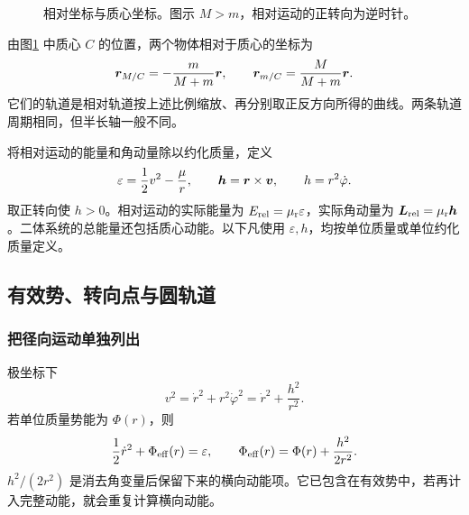 \begin{figure}[H]\centering
{}
\caption{相对坐标与质心坐标。图示 $M>m$，相对运动的正转向为逆时针。}\label{sup8:fig:d8-two-body}
\end{figure}

由图\ref{sup8:fig:d8-two-body} 中质心 $C$ 的位置，两个物体相对于质心的坐标为
\[
 \bm{r}_{M/C}=-\frac{m}{M+m}\bm{r},\qquad
 \bm{r}_{m/C}=\frac{M}{M+m}\bm{r}.
\]
它们的轨道是相对轨道按上述比例缩放、再分别取正反方向所得的曲线。两条轨道周期相同，但半长轴一般不同。

将相对运动的能量和角动量除以约化质量，定义
\begin{equation}\label{sup8:eq:d8-invariants}
 \varepsilon=\frac12v^2-\frac{\mu}{r},\qquad
 \bm{h}=\bm{r}\times\bm{v},\qquad h=r^2\dot\varphi.
\end{equation}
取正转向使 $h>0$。相对运动的实际能量为 $E_{\rm rel}=\mu_{\rm r}\varepsilon$，实际角动量为 $\bm{L}_{\rm rel}=\mu_{\rm r}\bm{h}$。二体系统的总能量还包括质心动能。以下凡使用 $\varepsilon,h$，均按单位质量或单位约化质量定义。


\subsection{有效势、转向点与圆轨道}
\subsubsection{把径向运动单独列出}

极坐标下
\[
 v^2=\dot r^2+r^2\dot\varphi^2=\dot r^2+\frac{h^2}{r^2}.
\]
若单位质量势能为 $\Phi(r)$，则
\begin{equation}\label{sup8:eq:d8-effective}
 \frac12\dot r^2+\Phi_{\rm eff}(r)=\varepsilon,\qquad
 \Phi_{\rm eff}(r)=\Phi(r)+\frac{h^2}{2r^2}.
\end{equation}
$h^2/(2r^2)$ 是消去角变量后保留下来的横向动能项。它已包含在有效势中，若再计入完整动能，就会重复计算横向动能。

